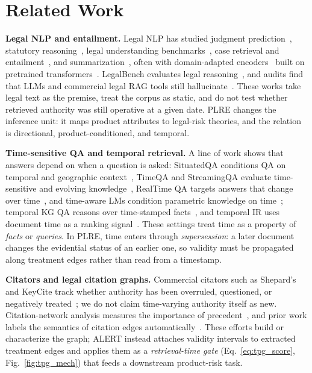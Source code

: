 \section{Related Work}
\label{sec:related_work}

\textbf{Legal NLP and entailment.} Legal NLP has studied judgment prediction~\citep{chalkidis2019neural}, statutory reasoning~\citep{holzenberger2020sara}, legal understanding benchmarks~\citep{chalkidis2022lexglue}, case retrieval and entailment~\citep{rabelo2022coliee}, and summarization~\citep{huang2021efficient,manor2019plain}, often with domain-adapted encoders~\citep{chalkidis2020legalbert,zheng2021legalbert,xiao2021lawformer} built on pretrained transformers~\citep{vaswani2017attention,devlin2019bert}. LegalBench evaluates legal reasoning~\citep{guha2023legalbench}, and audits find that LLMs and commercial legal RAG tools still hallucinate~\citep{dahl2024hallucinating,magesh2024hallucination}. These works take legal text as the premise, treat the corpus as static, and do not test whether retrieved authority was still operative at a given date. PLRE changes the inference unit: it maps product attributes to legal-risk theories, and the relation is directional, product-conditioned, and temporal.

\textbf{Time-sensitive QA and temporal retrieval.} A line of work shows that answers depend on when a question is asked: SituatedQA conditions QA on temporal and geographic context~\citep{zhang2021situatedqa}, TimeQA and StreamingQA evaluate time-sensitive and evolving knowledge~\citep{chen2021timeqa,liska2022streamingqa}, RealTime QA targets answers that change over time~\citep{kasai2023realtimeqa}, and time-aware LMs condition parametric knowledge on time~\citep{dhingra2022timeaware}; temporal KG QA reasons over time-stamped facts~\citep{saxena2021cronkgqa}, and temporal IR uses document time as a ranking signal~\citep{campos2014temporal}. These settings treat time as a property of \emph{facts} or \emph{queries}. In PLRE, time enters through \emph{supersession}: a later document changes the evidential status of an earlier one, so validity must be propagated along treatment edges rather than read from a timestamp.

\textbf{Citators and legal citation graphs.} Commercial citators such as Shepard's and KeyCite track whether authority has been overruled, questioned, or negatively treated~\citep{shepards2024,keycite2024}; we do not claim time-varying authority itself as new. Citation-network analysis measures the importance of precedent~\citep{fowler2007network}, and prior work labels the semantics of citation edges automatically~\citep{sadeghian2018semantic}. These efforts build or characterize the graph; ALERT instead attaches validity intervals to extracted treatment edges and applies them as a \emph{retrieval-time gate} (Eq.~\eqref{eq:tpg_score}, Fig.~\ref{fig:tpg_mech}) that feeds a downstream product-risk task.

